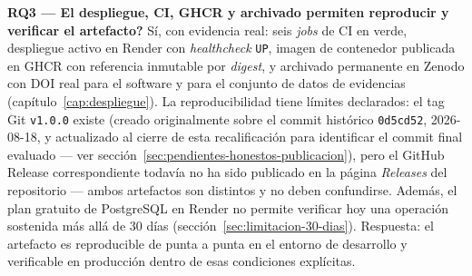\textbf{RQ3 --- \textquestiondown El despliegue, CI, GHCR y archivado
permiten reproducir y verificar el artefacto?} S\'i, con evidencia real:
seis \emph{jobs} de CI en verde, despliegue activo en Render con
\emph{healthcheck} \texttt{UP}, imagen de contenedor publicada en GHCR con
referencia inmutable por \emph{digest}, y archivado permanente en Zenodo
con DOI real para el software y para el conjunto de datos de evidencias
(cap\'itulo~\ref{cap:despliegue}). La reproducibilidad tiene l\'imites
declarados: el tag Git \texttt{v1.0.0} existe (creado originalmente sobre
el commit hist\'orico \texttt{0d5cd52}, 2026-08-18, y actualizado al
cierre de esta recalificaci\'on para identificar el commit final
evaluado --- ver secci\'on~\ref{sec:pendientes-honestos-publicacion}),
pero el GitHub Release correspondiente todav\'ia no ha
sido publicado en la p\'agina \emph{Releases} del repositorio --- ambos
artefactos son distintos y no deben confundirse. Adem\'as, el plan
gratuito de PostgreSQL en Render no permite verificar hoy una
operaci\'on sostenida m\'as all\'a de 30 d\'ias
(secci\'on~\ref{sec:limitacion-30-dias}). Respuesta: el artefacto es
reproducible de punta a punta en el entorno de desarrollo y verificable en
producci\'on dentro de esas condiciones expl\'icitas.
